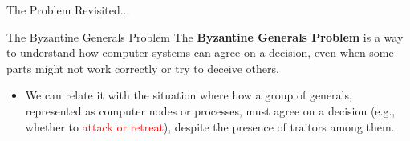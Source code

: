 \documentclass{beamer}
\begin{document}

\begin{frame}{The Problem Revisited...}
\begin{alertblock}{The Byzantine Generals Problem}
 The \textbf{Byzantine Generals Problem} is a way to understand how computer systems can agree on a decision, even when some parts might not work correctly or try to deceive others. 
 \end{alertblock}
 \end{frame}
 \begin{frame}
 \begin{itemize}
     \item 
      We can relate it with the situation where \textcolor{byzantinePurple}{how a group of generals, represented as computer nodes or processes, must agree on a decision (e.g.,
      whether to \textcolor{red}{attack or retreat}), despite the presence of traitors among them.}
       \end{itemize}
 \end{frame}
\end{document}

